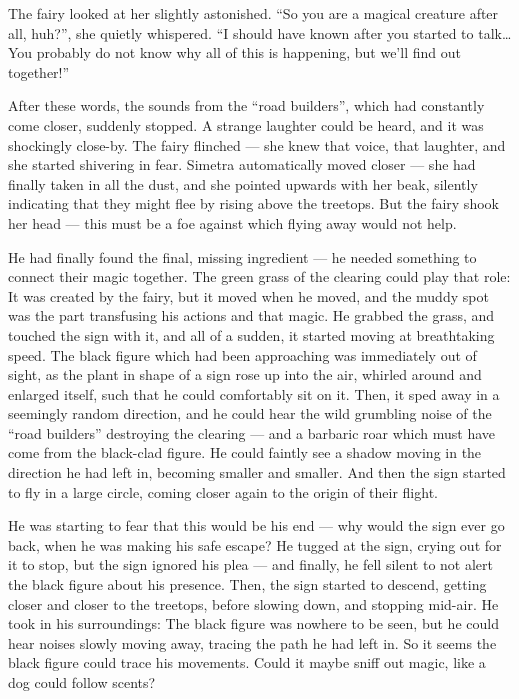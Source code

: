 The fairy looked at her slightly astonished. \enquote{So you are a magical creature after all, huh?}, she quietly whispered. \enquote{I should have known after you started to talk\dots{} You probably do not know why all of this is happening, but we'll find out together!}

After these words, the sounds from the \enquote{road builders}, which had constantly come closer, suddenly stopped. A strange laughter could be heard, and it was shockingly close-by. The fairy flinched --- she knew that voice, that laughter, and she started shivering in fear. Simetra automatically moved closer --- she had finally taken in all the dust, and she pointed upwards with her beak, silently indicating that they might flee by rising above the treetops. But the fairy shook her head --- this must be a foe against which flying away would not help.

\fancybreaker{}

He had finally found the final, missing ingredient --- he needed something to connect their magic together. The green grass of the clearing could play that role: It was created by the fairy, but it moved when he moved, and the muddy spot was the part transfusing his actions and that magic. He grabbed the grass, and touched the sign with it, and all of a sudden, it started moving at breathtaking speed. The black figure which had been approaching was immediately out of sight, as the plant in shape of a sign rose up into the air, whirled around and enlarged itself, such that he could comfortably sit on it. Then, it sped away in a seemingly random direction, and he could hear the wild grumbling noise of the \enquote{road builders} destroying the clearing --- and a barbaric roar which must have come from the black-clad figure. He could faintly see a shadow moving in the direction he had left in, becoming smaller and smaller. And then the sign started to fly in a large circle, coming closer again to the origin of their flight.

He was starting to fear that this would be his end --- why would the sign ever go back, when he was making his safe escape? He tugged at the sign, crying out for it to stop, but the sign ignored his plea --- and finally, he fell silent to not alert the black figure about his presence. Then, the sign started to descend, getting closer and closer to the treetops, before slowing down, and stopping mid-air. He took in his surroundings: The black figure was nowhere to be seen, but he could hear noises slowly moving away, tracing the path he had left in. So it seems the black figure could trace his movements. Could it maybe sniff out magic, like a dog could follow scents?

